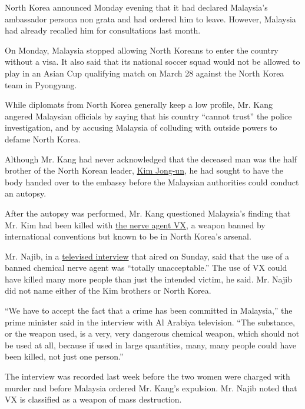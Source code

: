 North Korea announced Monday evening that it had declared Malaysia's
ambassador persona non grata and had ordered him to leave. However,
Malaysia had already recalled him for consultations last month.

On Monday, Malaysia stopped allowing North Koreans to enter the country
without a visa. It also said that its national soccer squad would not be
allowed to play in an Asian Cup qualifying match on March 28 against the
North Korea team in Pyongyang.

While diplomats from North Korea generally keep a low profile, Mr. Kang
angered Malaysian officials by saying that his country ``cannot trust''
the police investigation, and by accusing Malaysia of colluding with
outside powers to defame North Korea.

Although Mr. Kang had never acknowledged that the deceased man was the
half brother of the North Korean leader,
\href{https://www.nytimes3xbfgragh.onion/topic/person/kim-jongun?inline=nyt-per}{Kim
Jong-un}, he had sought to have the body handed over to the embassy
before the Malaysian authorities could conduct an autopsy.

After the autopsy was performed, Mr. Kang questioned Malaysia's finding
that Mr. Kim had been killed with
\href{https://www.nytimes3xbfgragh.onion/2017/02/24/world/asia/vx-nerve-agent-kim-jong-nam.html}{the
nerve agent VX}, a weapon banned by international conventions but known
to be in North Korea's arsenal.

Mr. Najib, in a
\href{http://english.alarabiya.net/en/News/gulf/2017/03/05/Malaysia-s-PM-Razak-Mutual-desire-for-security-cooperation-with-Saudi-Arabia.html}{televised
interview} that aired on Sunday, said that the use of a banned chemical
nerve agent was ``totally unacceptable.'' The use of VX could have
killed many more people than just the intended victim, he said. Mr.
Najib did not name either of the Kim brothers or North Korea.

``We have to accept the fact that a crime has been committed in
Malaysia,'' the prime minister said in the interview with Al Arabiya
television. ``The substance, or the weapon used, is a very, very
dangerous chemical weapon, which should not be used at all, because if
used in large quantities, many, many people could have been killed, not
just one person.''

The interview was recorded last week before the two women were charged
with murder and before Malaysia ordered Mr. Kang's expulsion. Mr. Najib
noted that VX is classified as a weapon of mass destruction.

